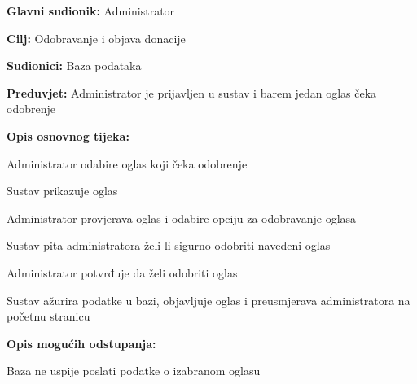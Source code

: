 					\noindent {}
					\begin{packed_item}
	
						\item \textbf{Glavni sudionik: }Administrator
						\item  \textbf{Cilj:} Odobravanje i objava donacije
						\item  \textbf{Sudionici:} Baza podataka
						\item  \textbf{Preduvjet:} Administrator je prijavljen u sustav i barem jedan oglas čeka odobrenje
						\eject
						\item  \textbf{Opis osnovnog tijeka:}
						
						\item[] \begin{packed_enum}
							\item Administrator odabire oglas koji čeka odobrenje
							\item Sustav prikazuje oglas
							\item Administrator provjerava oglas i odabire opciju za odobravanje oglasa
							\item Sustav pita administratora želi li sigurno odobriti navedeni oglas
							\item Administrator potvrđuje da želi odobriti oglas
							\item Sustav ažurira podatke u bazi, objavljuje oglas i preusmjerava administratora na početnu stranicu
						\end{packed_enum}

						\item  \textbf{Opis mogućih odstupanja:}

						\item[] \begin{packed_item}
							\item[2.a] Baza ne uspije poslati podatke o izabranom oglasu
							\item[] \begin{packed_enum}
								

\end{packed_enum}
\end{packed_item}
\end{packed_item}
